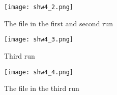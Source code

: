 \documentclass[20pt]{article}
\begin{document}
\begin{figure}[h!]
  \texttt{[image: shw4\_2.png]}
  \caption{The file in the first and second run}
  \label{fig:code}
\end{figure}

\begin{figure}[h!]
  \texttt{[image: shw4\_3.png]}
  \caption{Third run}
  \label{fig:code}
\end{figure}

\begin{figure}[h!]
  \texttt{[image: shw4\_4.png]}
  \caption{The file in the third run}
  \label{fig:code}
\end{figure}
\end{document}

